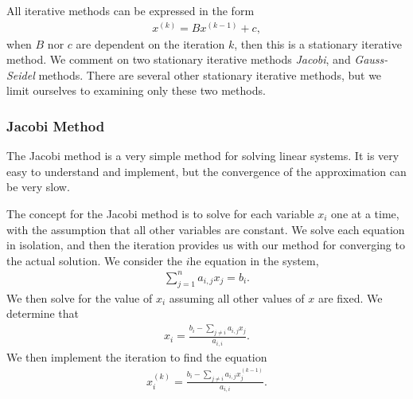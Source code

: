 \documentclass[../fem.tex]{subfiles}
\begin{document}
All iterative methods can be expressed in the form
\begin{align*}
  x^{(k)}=Bx^{(k-1)}+c,
\end{align*}
when $B$ nor $c$ are dependent on the iteration $k$, then this is a stationary
iterative method. We comment on two stationary iterative methods
\textit{Jacobi}, and \textit{Gauss-Seidel} methods. There are several other
stationary iterative methods, but we limit ourselves to examining only these two
methods.

\subsubsection{Jacobi Method}%
\label{ssub:jacobi_method}

The Jacobi method is a very simple method for solving linear systems. It is
very easy to understand and implement, but the convergence of the approximation
can be very slow.

\begin{Figure}
   \begin{center}
     
   \end{center}
   \label{fig:j_time}
\end{Figure}

The concept for the Jacobi method is to solve for each variable $x_i$ one at a
time, with the assumption that all other variables are constant. We solve each
equation in isolation, and then the iteration provides us with our method for
converging to the actual solution. We consider the $i$he equation in the
system,
\begin{align*}
  \sum_{j=1}^na_{i,j}x_j=b_i.
\end{align*}
We then solve for the value of $x_i$ assuming all other values of $x$ are
fixed. We determine that
\begin{align*}
  x_i=\frac{b_i-\sum_{j\neq i}a_{i,j}x_j}{a_{i,i}}.
\end{align*}
We then implement the iteration to find the equation
\begin{align*}
  x_i^{(k)}=\frac{b_i-\sum_{j\neq i}a_{i,j}x_j^{(k-1)}}{a_{i,i}}.
\end{align*}

\begin{Figure}
   \begin{center}
     
   \end{center}
   \label{fig:j_err}
\end{Figure}
\end{document}
